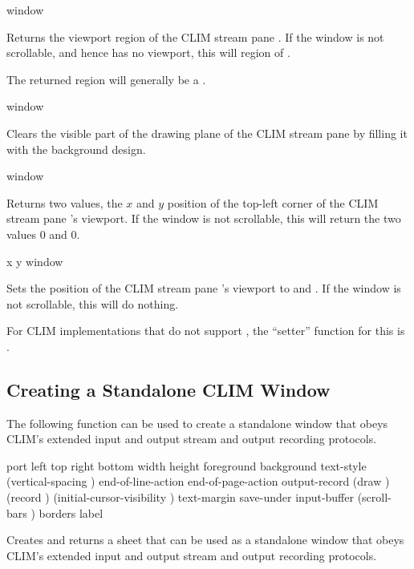  {window}

Returns the viewport region of the CLIM stream pane .  If the window
is not scrollable, and hence has no viewport, this will region 
of .

The returned region will generally be a .

 {window}

Clears the visible part of the drawing plane of the CLIM stream pane
 by filling it with the background design.

 {window}

Returns two values, the $x$ and $y$ position of the top-left corner of the CLIM
stream pane 's viewport.  If the window is not scrollable, this will
return the two values 0 and 0.

 {x y window}

Sets the position of the CLIM stream pane 's viewport to  and
.  If the window is not scrollable, this will do nothing.

For CLIM implementations that do not support , the ``setter'' function
for this is .


\subsection {Creating a Standalone CLIM Window}

The following function can be used to create a standalone window that obeys
CLIM's extended input and output stream and output recording protocols.

 {\key port left top right bottom width height
                                  foreground background text-style
                                  (vertical-spacing )
                                  end-of-line-action end-of-page-action
                                  output-record (draw ) (record )
                                  (initial-cursor-visibility )
                                  text-margin save-under input-buffer
                                  (scroll-bars ) borders label}

Creates and returns a sheet that can be used as a standalone window that obeys
CLIM's extended input and output stream and output recording protocols.

